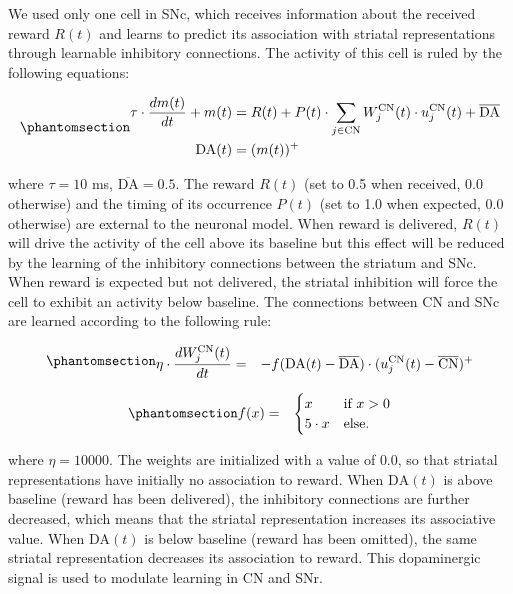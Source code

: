 \documentclass[
  11pt,
  a4paper,
]{scrbook}
\begin{document}
We used only one cell in SNc, which receives information about the
received reward \(R(t)\) and learns to predict its association with
striatal representations through learnable inhibitory connections. The
activity of this cell is ruled by the following equations:

\begin{equation}\phantomsection\label{eq-ficn:mp-snc}{
\begin{aligned}
    \tau \cdot \frac{d m(t)}{dt} + m(t) & =   R(t) + P(t) \cdot \displaystyle\sum_{j \in \text{CN}} W^{\text{CN}}_{j}(t) \cdot u^{\text{CN}}_j(t)  +  \overline{\text{DA}} \\
    \text{DA}(t) & =  (m(t))^+
\end{aligned}
}\end{equation}

where \(\tau = 10\) ms, \(\overline{\text{DA}} = 0.5\). The reward
\(R(t)\) (set to 0.5 when received, 0.0 otherwise) and the timing of its
occurrence \(P(t)\) (set to 1.0 when expected, 0.0 otherwise) are
external to the neuronal model. When reward is delivered, \(R(t)\) will
drive the activity of the cell above its baseline but this effect will
be reduced by the learning of the inhibitory connections between the
striatum and SNc. When reward is expected but not delivered, the
striatal inhibition will force the cell to exhibit an activity below
baseline. The connections between CN and SNc are learned according to
the following rule:

\begin{equation}\phantomsection\label{eq-ficn:weightsnc}{
\begin{aligned}
    \eta \cdot \frac{d W^{\text{CN}}_{j}(t)}{d t}  & =& - f( \text{DA}(t) - \overline{\text{DA}} ) \cdot (u^{\text{CN}}_j(t) - \overline{\text{CN}})^+
\end{aligned}
}\end{equation}

\begin{equation}\phantomsection\label{eq-ficn:fsnc}{\begin{aligned}
    f(x) & = &
     \begin{cases}
        x & \text{if $x > 0$}  \\
        5 \cdot x  & \text{else.}
     \end{cases}
\end{aligned}
}\end{equation}

where \(\eta = 10000\). The weights are initialized with a value of
\(0.0\), so that striatal representations have initially no association
to reward. When \(\text{DA}(t)\) is above baseline (reward has been
delivered), the inhibitory connections are further decreased, which
means that the striatal representation increases its associative value.
When \(\text{DA}(t)\) is below baseline (reward has been omitted), the
same striatal representation decreases its association to reward. This
dopaminergic signal is used to modulate learning in CN and SNr.
\end{document}
